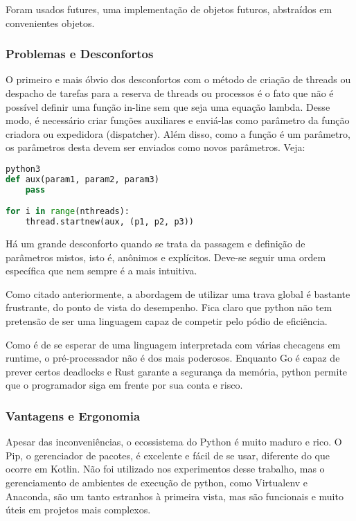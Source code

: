 \documentclass{article}
\begin{document}
Foram usados futures, uma implementação de objetos futuros, abstraídos em convenientes objetos.

\subsubsection{Problemas e Desconfortos}
\label{sssec:python problemas}

O primeiro e mais óbvio dos desconfortos com o método de criação de threads ou despacho de tarefas para a reserva de threads ou processos é o fato que não é possível definir uma função in-line sem que seja uma equação lambda. Desse modo, é necessário criar funções auxiliares e enviá-las como parâmetro da função criadora ou expedidora (dispatcher). Além disso, como a função é um parâmetro, os parâmetros desta devem ser enviados como novos parâmetros. Veja:

\begin{lstlisting}[language=Python]
python3
def aux(param1, param2, param3)
    pass

for i in range(nthreads):
    thread.startnew(aux, (p1, p2, p3))
\end{lstlisting}

Há um grande desconforto quando se trata da passagem e definição de parâmetros mistos, isto é, anônimos e explícitos. Deve-se seguir uma ordem específica que nem sempre é a mais intuitiva.

Como citado anteriormente, a abordagem de utilizar uma trava global é bastante frustrante, do ponto de vista do desempenho. Fica claro que python não tem pretensão de ser uma linguagem capaz de competir pelo pódio de eficiência.

Como é de se esperar de uma linguagem interpretada com várias checagens em runtime, o pré-processador não é dos mais poderosos. Enquanto Go é capaz de prever certos deadlocks e Rust garante a segurança da memória, python permite que o programador siga em frente por sua conta e risco.

\subsubsection{Vantagens e Ergonomia}
\label{sssec:python vantagens}

Apesar das inconveniências, o ecossistema do Python é muito maduro e rico. O Pip, o gerenciador de pacotes, é excelente e fácil de se usar, diferente do que ocorre em Kotlin. Não foi utilizado nos experimentos desse trabalho, mas o gerenciamento de ambientes de execução de python, como Virtualenv e Anaconda, são um tanto estranhos à primeira vista, mas são funcionais e muito úteis em projetos mais complexos.
\end{document}
